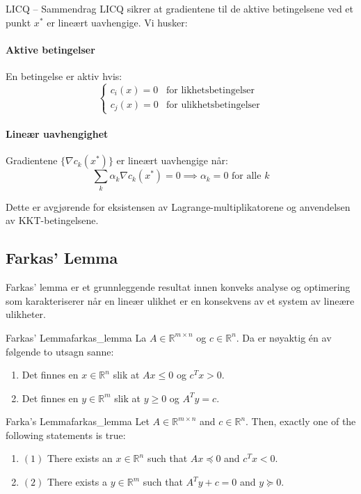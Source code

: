\begin{remark}{LICQ -- Sammendrag}{}
	LICQ sikrer at gradientene til de aktive betingelsene ved et punkt \(x^*\) er lineært uavhengige. Vi husker:

	\paragraph{Aktive betingelser} En betingelse er aktiv hvis:
	\[ \begin{cases}
			c_i(x) = 0 & \text{for likhetsbetingelser}  \\
			c_j(x) = 0 & \text{for ulikhetsbetingelser}
		\end{cases} \]

	\paragraph{Lineær uavhengighet} Gradientene \(\{\nabla c_k(x^*)\}\) er lineært uavhengige når:
	\[
		\sum_k \alpha_k \nabla c_k(x^*) = 0 \implies \alpha_k = 0 \text{ for alle } k
	\]

	Dette er avgjørende for eksistensen av Lagrange-multiplikatorene og anvendelsen av KKT-betingelsene.
\end{remark}

\subsection{Farkas' Lemma}

Farkas' lemma er et grunnleggende resultat innen konveks analyse og optimering som karakteriserer når en lineær ulikhet er en konsekvens av et system av lineære ulikheter.

\begin{lemma}{Farkas' Lemma}{farkas_lemma}
	La \( A \in \mathbb{R}^{m \times n} \) og \( c \in \mathbb{R}^n \). Da er nøyaktig én av følgende to utsagn sanne:
	\begin{enumerate}
		\item Det finnes en \( x \in \mathbb{R}^n \) slik at \( Ax \leq 0 \) og \( c^Tx > 0 \).
		\item Det finnes en \( y \in \mathbb{R}^m \) slik at \( y \geq 0 \) og \( A^Ty = c \).
	\end{enumerate}
\end{lemma}

\begin{lemma}{Farka's Lemma}{farkas_lemma}
	Let \(A \in \mathbb{R}^{m \times n}\) and \(c \in \mathbb{R}^n\). Then, exactly one of the following statements is true:
	\begin{enumerate}
		\item[] \((1)\) There exists an \(x \in \mathbb{R}^n\) such that \(Ax \preceq 0\) and \(c^T x < 0\).
		\item[] \((2)\) There exists a \(y \in \mathbb{R}^m\) such that \(A^T y + c = 0\) and \(y \succeq 0\).
	\end{enumerate}
\end{lemma}

